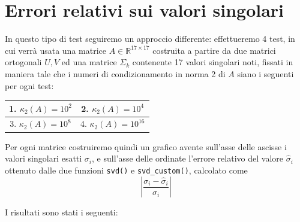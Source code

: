 \newpage
\section{Errori relativi sui valori singolari}
\label{sec:sigmas_relative_errors}
In questo tipo di test seguiremo un approccio differente: effettueremo 4 test, 
in cui verrà usata una matrice $A \in \mathbb{R}^{17 \times 17}$ costruita a 
partire da due matrici ortogonali $U, V$ ed una matrice $\Sigma_k$ contenente 17 
valori singolari noti, fissati in maniera tale che i numeri di condizionamento 
in norma 2 di $A$ siano i seguenti per ogni test:

\begin{center}
\begin{tabular}{|c|c|}
    \hline
    1. $\kappa_2(A) = 10^2$ & 2. $\kappa_2(A) = 10^4$ \\
    \hline
    3. $\kappa_2(A) = 10^8$ & 4. $\kappa_2(A) = 10^{16}$ \\
    \hline
\end{tabular}
\end{center}

Per ogni matrice costruiremo quindi un grafico avente sull'asse delle ascisse i 
valori singolari esatti $\sigma_i$, e sull'asse delle ordinate l'errore relativo 
del valore $\hat{\sigma}_i$ ottenuto dalle due funzioni \texttt{svd()} e 
\texttt{svd\_custom()}, calcolato come
\begin{equation*}
	\left| \frac{\sigma_i - \hat{\sigma}_i}{\sigma_i} \right|
\end{equation*}

I risultati sono stati i seguenti:

